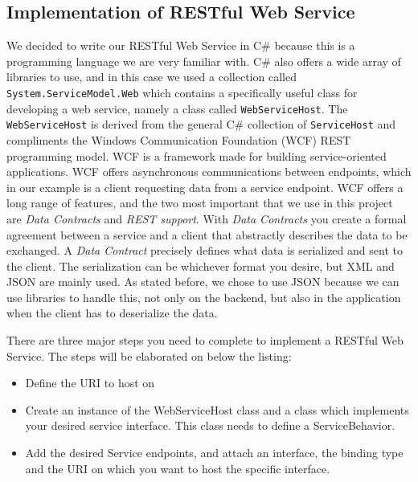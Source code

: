 \subsection{Implementation of RESTful Web Service}
\label{subsec:restImpl}

We decided to write our RESTful Web Service in C\# because this is a programming language we are very familiar with. C\# also offers a wide array of libraries to use, and in this case we used a collection called \texttt{System.ServiceModel.Web} which contains a specifically useful class for developing a web service, namely a class called \texttt{WebServiceHost}. The \texttt{WebServiceHost} is derived from the general C\# collection of \texttt{ServiceHost} and compliments the Windows Communication Foundation (WCF) REST programming model\cite{WebServiceHost}.
WCF is a framework made for building service-oriented applications. WCF offers asynchronous communications between endpoints, which in our example is a client requesting data from a service endpoint. WCF offers a long range of features, and the two most important that we use in this project are \textit{Data Contracts} and \textit{REST support}\cite{WCF}. 
With \textit{Data Contracts} you create a formal agreement between a service and a client that abstractly describes the data to be exchanged. A \textit{Data Contract} precisely defines what data is serialized and sent to the client. The serialization can be whichever format you desire, but XML and JSON are mainly used. As stated before, we chose to use JSON because we can use libraries to handle this, not only on the backend, but also in the application when the client has to deserialize the data.

There are three major steps you need to complete to implement a RESTful Web Service. The steps will be elaborated on below the listing:
\begin{itemize}
\item Define the URI to host on
\item Create an instance of the WebServiceHost class and a class which implements your desired service interface. This class needs to define a ServiceBehavior.
\item Add the desired Service endpoints, and attach an interface, the binding type and the URI on which you want to host the specific interface.
\end{itemize}


